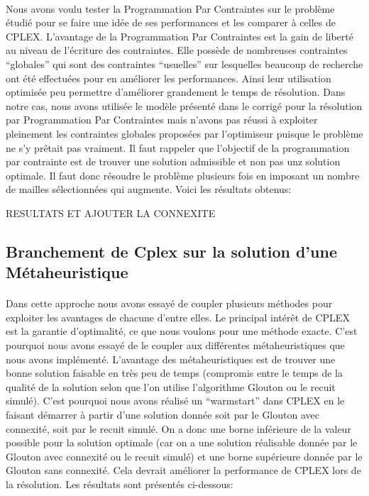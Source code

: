 \documentclass[a4paper, 11pt]{article} %
\begin{document}
\paragraph*{}
Nous avons voulu tester la Programmation Par Contraintes sur le problème étudié pour se faire une idée de ses performances et les comparer à celles de CPLEX. L'avantage de la Programmation Par Contraintes est la gain de liberté au niveau de l'écriture des contraintes. Elle possède de nombreuses contraintes ``globales'' qui sont des contraintes ``usuelles'' sur lesquelles beaucoup de recherche ont été effectuées pour en améliorer les performances. Ainsi leur utilisation optimisée peu permettre d'améliorer grandement le temps de résolution. Dans notre cas, nous avons utilisée le modèle présenté dans le corrigé pour la résolution par Programmation Par Contraintes mais n'avons pas réussi à exploiter pleinement les contraintes globales proposées par l'optimiseur puisque le problème ne s'y prêtait pas vraiment. Il faut rappeler que l'objectif de la programmation par contrainte est de trouver une solution admissible et non pas unz solution optimale. Il faut donc résoudre le problème plusieurs fois en imposant un nombre de mailles sélectionnées qui augmente. Voici les résultats obtenus:

RESULTATS ET AJOUTER LA CONNEXITE

\subsection{Branchement de Cplex sur la solution d'une Métaheuristique}

\paragraph*{}
Dans cette approche nous avons essayé de coupler plusieurs méthodes pour exploiter les avantages de chacune d'entre elles. Le principal intérêt de CPLEX est la garantie d'optimalité, ce que nous voulons pour une méthode exacte. C'est pourquoi nous avons essayé de le coupler aux différentes métaheuristiques que nous avons implémenté. L'avantage des métaheuristiques est de trouver une bonne solution faisable en très peu de temps (compromis entre le temps de la qualité de la solution selon que l'on utilise l'algorithme Glouton ou le recuit simulé). C'est pourquoi nous avons réalisé un ``warmstart'' dans CPLEX en le faisant démarrer à partir d'une solution donnée soit par le Glouton avec connexité, soit par le recuit simulé. On a donc une borne inférieure de la valeur possible pour la solution optimale (car on a une solution réalisable donnée par le Glouton avec connexité ou le recuit simulé) et une borne supérieure donnée par le Glouton sans connexité. Cela devrait améliorer la performance de CPLEX lors de la résolution. Les résultats sont présentés ci-dessous:
\end{document}
